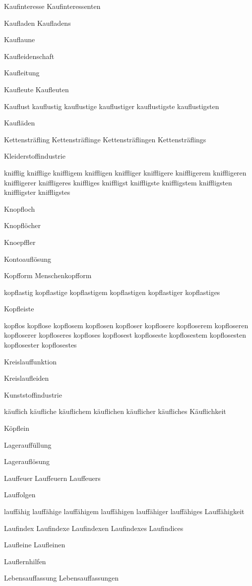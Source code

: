 Kaufinteresse Kaufinteressenten

Kaufladen Kaufladens

Kauflaune

Kaufleidenschaft

Kaufleitung

Kaufleute Kaufleuten

Kauflust kauflustig kauflustige kauflustiger kauflustigste kauflustigsten

Kaufläden

Kettensträfling Kettensträflinge Kettensträflingen Kettensträflings

Kleiderstoffindustrie

knifflig knifflige kniffligem kniffligen kniffliger kniffligere kniffligerem kniffligeren kniffligerer kniffligeres kniffliges kniffligst kniffligste kniffligstem kniffligsten kniffligster kniffligstes

Knopfloch

Knopflöcher

Knoepffler

Kontoauflösung

Kopfform Menschenkopfform

kopflastig kopflastige kopflastigem kopflastigen kopflastiger kopflastiges

Kopfleiste

kopflos kopflose kopflosem kopflosen kopfloser kopflosere kopfloserem kopfloseren kopfloserer kopfloseres kopfloses kopflosest kopfloseste kopflosestem kopflosesten kopflosester kopflosestes

Kreislauffunktion

Kreislaufleiden

Kunststoffindustrie

käuflich käufliche käuflichem käuflichen käuflicher käufliches Käuflichkeit

Köpflein

Lagerauffüllung

Lagerauflösung

Lauffeuer Lauffeuern Lauffeuers

Lauffolgen

lauffähig lauffähige lauffähigem lauffähigen lauffähiger lauffähiges Lauffähigkeit

Laufindex Laufindexe Laufindexen Laufindexes Laufindices

Laufleine Laufleinen

Lauflernhilfen

Lebensauffassung Lebensauffassungen

